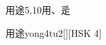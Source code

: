 \begin{entry}{用途}{5,10}{⽤、⾡}
  \begin{phonetics}{用途}{yong4tu2}[][HSK 4]
  \end{phonetics}
\end{entry}
